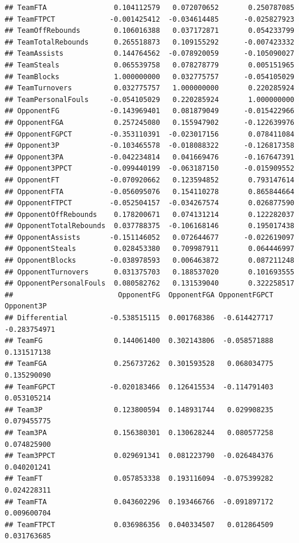 \documentclass[]{book}
\begin{document}
\begin{verbatim}
## TeamFTA                0.104112579   0.072070652       0.250787085
## TeamFTPCT             -0.001425412  -0.034614485      -0.025827923
## TeamOffRebounds        0.106016388   0.037172871       0.054233799
## TeamTotalRebounds      0.265518873   0.109155292      -0.007423332
## TeamAssists            0.144764562  -0.078920059      -0.105090027
## TeamSteals             0.065539758   0.078278779       0.005151965
## TeamBlocks             1.000000000   0.032775757      -0.054105029
## TeamTurnovers          0.032775757   1.000000000       0.220285924
## TeamPersonalFouls     -0.054105029   0.220285924       1.000000000
## OpponentFG            -0.143969401   0.081879049      -0.015422966
## OpponentFGA            0.257245080   0.155947902      -0.122639976
## OpponentFGPCT         -0.353110391  -0.023017156       0.078411084
## Opponent3P            -0.103465578  -0.018088322      -0.126817358
## Opponent3PA           -0.042234814   0.041669476      -0.167647391
## Opponent3PPCT         -0.099440199  -0.063187150      -0.015909552
## OpponentFT            -0.070920662   0.123594852       0.793147614
## OpponentFTA           -0.056095076   0.154110278       0.865844664
## OpponentFTPCT         -0.052504157  -0.034267574       0.026877590
## OpponentOffRebounds    0.178200671   0.074131214       0.122282037
## OpponentTotalRebounds  0.037788375  -0.106168146       0.195017438
## OpponentAssists       -0.151146052   0.072644677      -0.022619097
## OpponentSteals         0.028453380   0.709987911       0.064446997
## OpponentBlocks        -0.038978593   0.006463872       0.087211248
## OpponentTurnovers      0.031375703   0.188537020       0.101693555
## OpponentPersonalFouls  0.080582762   0.131539040       0.322258517
##                         OpponentFG  OpponentFGA OpponentFGPCT   Opponent3P
## Differential          -0.538515115  0.001768386  -0.614427717 -0.283754971
## TeamFG                 0.144061400  0.302143806  -0.058571888  0.131517138
## TeamFGA                0.256737262  0.301593528   0.068034775  0.135290090
## TeamFGPCT             -0.020183466  0.126415534  -0.114791403  0.053105214
## Team3P                 0.123800594  0.148931744   0.029908235  0.079455775
## Team3PA                0.156380301  0.130628244   0.080577258  0.074825900
## Team3PPCT              0.029691341  0.081223790  -0.026484376  0.040201241
## TeamFT                 0.057853338  0.193116094  -0.075399282  0.024228311
## TeamFTA                0.043602296  0.193466766  -0.091897172  0.009600704
## TeamFTPCT              0.036986356  0.040334507   0.012864509  0.031763685

\end{verbatim}
\end{document}
